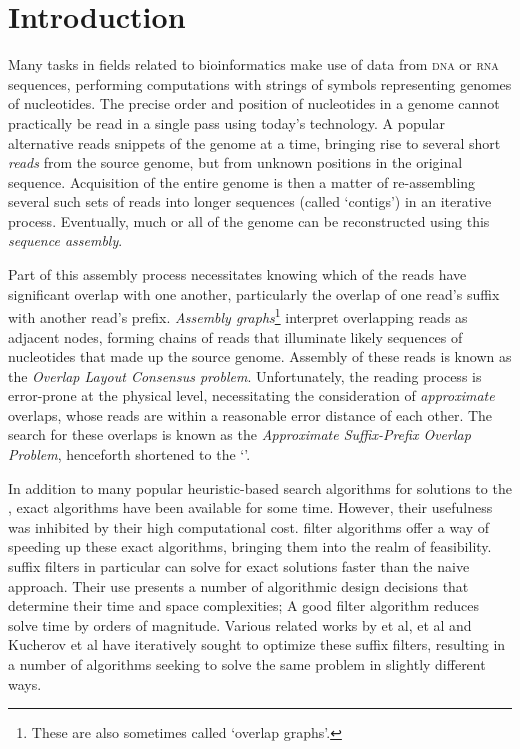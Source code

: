 \chapter{Introduction}

Many tasks in fields related to bioinformatics make use of data from \textsc{dna} or \textsc{rna} sequences, performing computations with strings of symbols representing genomes of nucleotides. The precise order and position of nucleotides in a genome cannot practically be read in a single pass using today’s technology. A popular alternative reads snippets of the genome at a time, bringing rise to several short \textit{reads} from the \gls{source genome}, but from unknown positions in the original sequence. Acquisition of the entire genome is then a matter of re-assembling several such sets of reads into longer sequences (called `contigs') in an iterative process. Eventually, much or all of the genome can be reconstructed using this \textit{sequence assembly}.
 
Part of this assembly process necessitates knowing which of the reads have significant overlap with one another, particularly the overlap of one read's suffix with another read's prefix. \textit{Assembly graphs}\footnote{These are also sometimes called `overlap graphs'.} interpret overlapping reads as adjacent nodes, forming chains of reads that illuminate likely sequences of nucleotides that made up the source genome. Assembly of these reads is known as the \textit{Overlap Layout Consensus problem}. Unfortunately, the reading process is error-prone at the physical level, necessitating the consideration of \textit{approximate} overlaps, whose reads are within a reasonable \gls{error distance} of each other. The search for these overlaps is known as the \textit{Approximate Suffix-Prefix Overlap Problem}, henceforth shortened to the `\aspop{}'.
 
In addition to many popular heuristic-based search algorithms for solutions to the \aspop{}, exact algorithms have been available for some time. However, their usefulness was inhibited by their high computational cost. \Glspl{filter algorithm} offer a way of speeding up these exact algorithms, bringing them into the realm of feasibility. \Glspl{suffix filter} in particular can solve for exact solutions faster than the naive approach. Their use presents a number of algorithmic design decisions that determine their time and space complexities; A good filter algorithm reduces solve time by orders of magnitude. Various related works by \kark{} et al, \vali{} et al and Kucherov et al have iteratively sought to optimize these suffix filters, resulting in a number of algorithms seeking to solve the same problem in slightly different ways.

